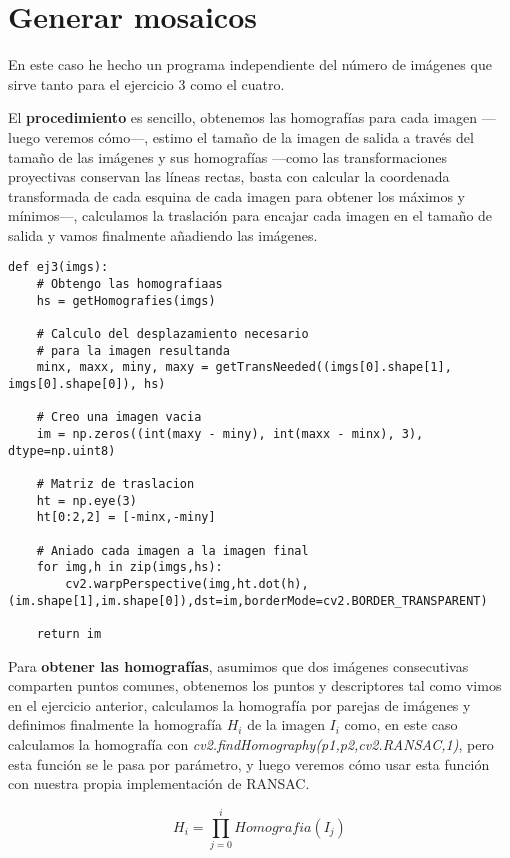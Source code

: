 \documentclass{article}
\begin{document}
\section{Generar mosaicos}

En este caso he hecho un programa independiente del número de imágenes que sirve tanto para el ejercicio 3 como el cuatro.

El \textbf{procedimiento} es sencillo, obtenemos las homografías para cada imagen ---luego veremos cómo---, estimo el tamaño de la imagen de salida a través del tamaño de las imágenes y sus homografías ---como las transformaciones proyectivas conservan las líneas rectas, basta con calcular la coordenada transformada de cada esquina de cada imagen para obtener los máximos y mínimos---, calculamos la traslación para encajar cada imagen en el tamaño de salida y vamos finalmente añadiendo las imágenes.

\begin{lstlisting}
def ej3(imgs):
    # Obtengo las homografiaas
    hs = getHomografies(imgs)
    
    # Calculo del desplazamiento necesario
    # para la imagen resultanda
    minx, maxx, miny, maxy = getTransNeeded((imgs[0].shape[1], imgs[0].shape[0]), hs)
    
    # Creo una imagen vacia
    im = np.zeros((int(maxy - miny), int(maxx - minx), 3), dtype=np.uint8)
    
    # Matriz de traslacion 
    ht = np.eye(3)
    ht[0:2,2] = [-minx,-miny]
	
    # Aniado cada imagen a la imagen final
    for img,h in zip(imgs,hs):
        cv2.warpPerspective(img,ht.dot(h),(im.shape[1],im.shape[0]),dst=im,borderMode=cv2.BORDER_TRANSPARENT)

    return im
\end{lstlisting}

Para \textbf{obtener las homografías}, asumimos que dos imágenes consecutivas comparten puntos comunes, obtenemos los puntos y descriptores tal como vimos en el ejercicio anterior, calculamos la homografía por parejas de imágenes y definimos finalmente la homografía $H_i$ de la imagen $I_i$ como, en este caso calculamos la homografía con \textit{cv2.findHomography(p1,p2,cv2.RANSAC,1)}, pero esta función se le pasa por parámetro, y luego veremos cómo usar esta función con nuestra propia implementación de RANSAC.

\[ H_i = \prod_{j=0}^{i} Homografia(I_j)  \]
\end{document}
